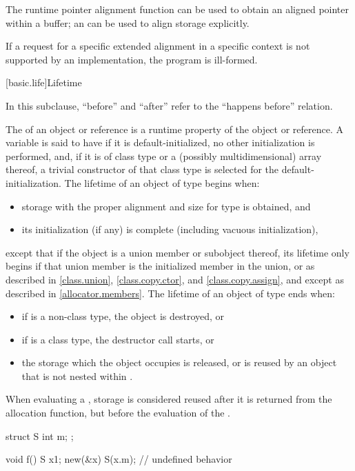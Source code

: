 \pnum
\begin{note}
The runtime pointer alignment function
can be used to obtain an aligned pointer within a buffer;
an 
can be used to align storage explicitly.
\end{note}

\pnum
If a request for a specific extended alignment in a specific context is not
supported by an implementation, the program is ill-formed.

[basic.life]{Lifetime}

\pnum
In this subclause, ``before'' and ``after'' refer to the ``happens before''
relation.

\pnum
{}%
The  of an object or reference is a runtime property of the
object or reference.
A variable is said to have 
if it is default-initialized, no other initialization is performed, and,
if it is of class type or a (possibly multidimensional) array thereof,
a trivial constructor of that class type is selected for
the default-initialization.
The lifetime of an object of type  begins when:
\begin{itemize}
\item storage with the proper alignment and size
  for type  is obtained, and
\item its initialization (if any) is complete
  (including vacuous initialization),
\end{itemize}
except that if the object is a union member or subobject thereof,
its lifetime only begins if that union member is the
initialized member in the union,
or as described in
\ref{class.union}, \ref{class.copy.ctor}, and \ref{class.copy.assign},
and except as described in \ref{allocator.members}.
The lifetime of an object  of type  ends when:
\begin{itemize}
\item if  is a non-class type, the object is destroyed, or
\item if  is a class type, the destructor call starts, or
\item the storage which the object occupies is released,
or is reused by an object that is not nested within .
\end{itemize}
When evaluating a ,
storage is considered reused after it is returned from the allocation function,
but before the evaluation of the .
\begin{example}
\begin{codeblock}
struct S {
  int m;
};

void f() {
  S x{1};
  new(&x) S(x.m);   // undefined behavior
}
\end{codeblock}
\end{example}

